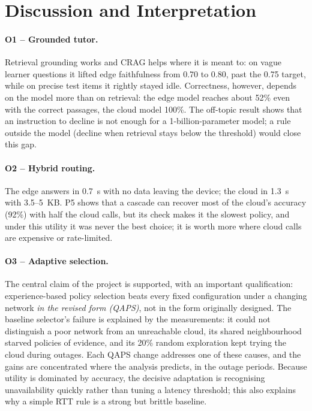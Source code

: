 \section{Discussion and Interpretation}
\label{sec:discussion}

\paragraph{O1 -- Grounded tutor.} Retrieval grounding works and CRAG helps where it is meant to: on vague
learner questions it lifted edge faithfulness from 0.70 to 0.80, past the 0.75 target, while on precise
test items it rightly stayed idle. Correctness, however, depends on the model more than on retrieval: the
edge model reaches about 52\% even with the correct passages, the cloud model 100\%. The off-topic result
shows that an instruction to decline is not enough for a 1-billion-parameter model; a rule outside the
model (decline when retrieval stays below the threshold) would close this gap.

\paragraph{O2 -- Hybrid routing.} The edge answers in 0.7~s with no data leaving the device; the cloud in
1.3~s with 3.5--5~KB. P5 shows that a cascade can recover most of the cloud's accuracy (92\%) with half
the cloud calls, but its check makes it the slowest policy, and under this utility it was never the best
choice; it is worth more where cloud calls are expensive or rate-limited.

\paragraph{O3 -- Adaptive selection.} The central claim of the project is supported, with an important
qualification: experience-based policy selection beats every fixed configuration under a changing network
\emph{in the revised form (QAPS)}, not in the form originally designed. The baseline selector's failure is
explained by the measurements: it could not distinguish a poor network from an unreachable cloud,
its shared neighbourhood starved policies of evidence, and its 20\% random exploration kept trying the
cloud during outages. Each QAPS change addresses one of these causes, and the gains are concentrated where
the analysis predicts, in the outage periods. Because utility is dominated by accuracy, the decisive
adaptation is recognising unavailability quickly rather than tuning a latency threshold; this also
explains why a simple RTT rule is a strong but brittle baseline.

